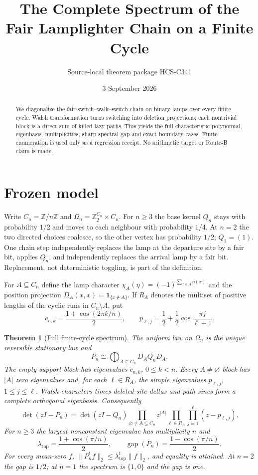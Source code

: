 \documentclass[10pt]{article}
\title{The Complete Spectrum of the Fair Lamplighter Chain on a Finite Cycle}
\author{Source-local theorem package HCS-C341}
\date{3 September 2026}
\newtheorem{theorem}{Theorem}
\newcommand{\1}{\mathbf 1}
\begin{document}
\maketitle
\begin{abstract}
We diagonalize the fair switch--walk--switch chain on binary lamps over every
finite cycle.  Walsh transformation turns switching into deletion projections;
each nontrivial block is a direct sum of killed lazy paths.  This yields the
full characteristic polynomial, eigenbasis, multiplicities, sharp spectral
gap and exact boundary cases.  Finite enumeration is used only as a regression
receipt.  No arithmetic target or Route-B claim is made.
\end{abstract}

\section{Frozen model}
Write $C_n=\mathbb Z/n\mathbb Z$ and
$\Omega_n=\mathbb Z_2^{C_n}\times C_n$.  For $n\ge3$ the base kernel $Q_n$
stays with probability $1/2$ and moves to each neighbour with probability
$1/4$.  At $n=2$ the two directed choices coalesce, so the other vertex has
probability $1/2$; $Q_1=(1)$.  One chain step independently replaces the lamp
at the departure site by a fair bit, applies $Q_n$, and independently replaces
the arrival lamp by a fair bit.  Replacement, not deterministic toggling, is
part of the definition.

For $A\subseteq C_n$ define the lamp character
$\chi_A(\eta)=(-1)^{\sum_{x\in A}\eta(x)}$ and the position projection
$D_A(x,x)=\1_{\{x\notin A\}}$.  If $R_A$ denotes the multiset of positive
lengths of the cyclic runs in $C_n\setminus A$, put
\[
c_{n,k}=\frac{1+\cos(2\pi k/n)}2,
\qquad p_{\ell,j}=\frac12+\frac12\cos\frac{\pi j}{\ell+1}.
\]

\begin{theorem}[Full finite-cycle spectrum]\label{thm:main}
The uniform law on $\Omega_n$ is the unique reversible stationary law and
\[
P_n\cong\bigoplus_{A\subseteq C_n}D_AQ_nD_A.             \tag{1}
\]
The empty-support block has eigenvalues $c_{n,k}$, $0\le k<n$.  Every
$A\ne\varnothing$ block has $|A|$ zero eigenvalues and, for each
$\ell\in R_A$, the simple eigenvalues $p_{\ell,j}$, $1\le j\le\ell$.
Walsh characters times deleted-site deltas and path sines form a complete
orthogonal eigenbasis.  Consequently
\[
\det(zI-P_n)=\det(zI-Q_n)
\prod_{\varnothing\ne A\subseteq C_n}z^{|A|}
\prod_{\ell\in R_A}\prod_{j=1}^{\ell}(z-p_{\ell,j}).    \tag{2}
\]
For $n\ge3$ the largest nonconstant eigenvalue has multiplicity $n$ and
\[
\lambda_{\mathrm{top}}=\frac{1+\cos(\pi/n)}2,\qquad
\operatorname{gap}(P_n)=\frac{1-\cos(\pi/n)}2.           \tag{3}
\]
For every mean-zero $f$,
$\|P_n^tf\|_2\le\lambda_{\mathrm{top}}^t\|f\|_2$, and equality is attained.
At $n=2$ the gap is $1/2$; at $n=1$ the spectrum is $\{1,0\}$ and the gap is
one.
\end{theorem}
\end{document}
